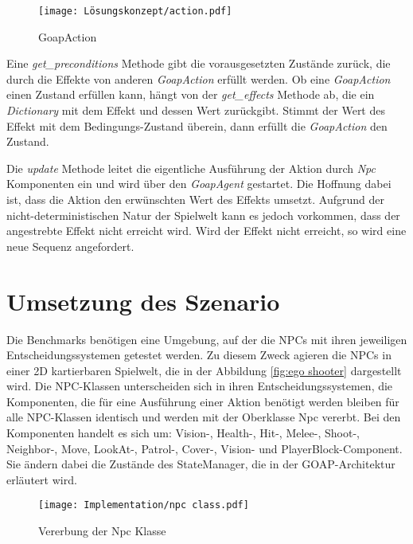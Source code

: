 \begin{figure}[h]
  \centering
  \texttt{[image: Lösungskonzept/action.pdf]}
	\captionsetup{justification=justified, format=plain}
  \caption{GoapAction}
  \label{fig:GoapAction}
\end{figure}


Eine \textit{get\_preconditions} Methode gibt die vorausgesetzten Zustände zurück, die durch die Effekte von anderen \textit{GoapAction} erfüllt werden. Ob eine \textit{GoapAction} einen Zustand erfüllen kann, hängt von der \textit{get\_effects} Methode ab, die ein \textit{Dictionary} mit dem Effekt und dessen Wert zurückgibt. Stimmt der Wert des Effekt mit dem Bedingungs-Zustand überein, dann erfüllt die \textit{GoapAction} den Zustand.

Die \textit{update} Methode leitet die eigentliche Ausführung der Aktion durch \textit{Npc} Komponenten ein und wird über den \textit{GoapAgent} gestartet. Die Hoffnung dabei ist, dass die Aktion den erwünschten Wert des Effekts umsetzt. Aufgrund der nicht-deterministischen Natur der Spielwelt kann es jedoch vorkommen, dass der angestrebte Effekt nicht erreicht wird. Wird der Effekt nicht erreicht, so wird eine neue Sequenz angefordert.










\section{Umsetzung des Szenario}
\label{chap:implementierung szenario}

Die Benchmarks benötigen eine Umgebung, auf der die NPCs mit ihren jeweiligen Entscheidungssystemen getestet werden. Zu diesem Zweck agieren die NPCs in einer 2D kartierbaren Spielwelt, die in der Abbildung \ref{fig:ego shooter} dargestellt wird. Die NPC-Klassen unterscheiden sich in ihren Entscheidungssystemen, die Komponenten, die für eine Ausführung einer Aktion benötigt werden bleiben für alle NPC-Klassen identisch und werden mit der Oberklasse Npc vererbt. Bei den Komponenten handelt es sich um: Vision-, Health-, Hit-, Melee-, Shoot-, Neighbor-, Move, LookAt-, Patrol-, Cover-, Vision- und PlayerBlock-Component. Sie ändern dabei die Zustände des StateManager, die in der GOAP-Architektur erläutert wird.

\begin{figure}[h]
  \centering
  \texttt{[image: Implementation/npc class.pdf]}
	\captionsetup{justification=justified, format=plain}
  \caption{Vererbung der Npc Klasse}
  \label{fig:npc class}
\end{figure}

